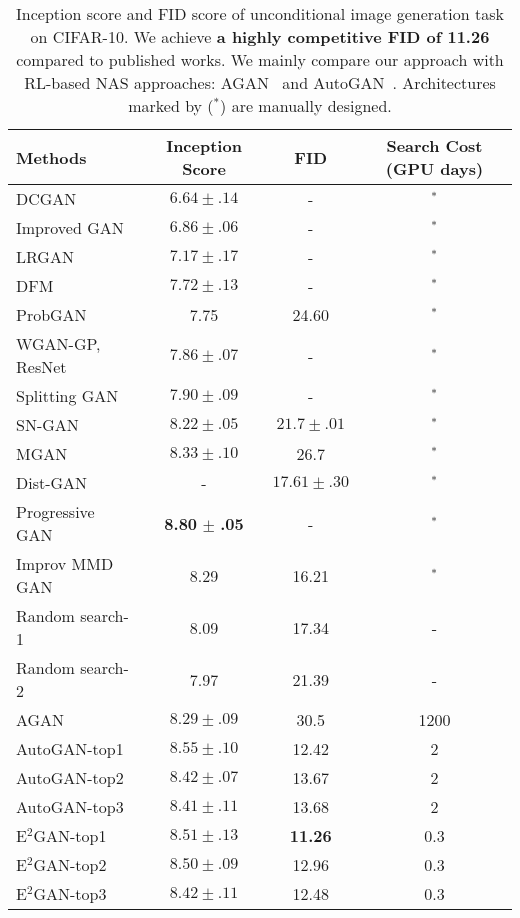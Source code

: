 \documentclass[runningheads]{llncs}
\begin{document}
\begin{table}[b!]
\begin{center}
\begin{tabular}{l|c|c|c}
Methods&Inception Score&FID&Search Cost (GPU days)\\
\hline
DCGAN~\cite{radford2015unsupervised}& $6.64 \pm .14$&-&$^*$\\
Improved GAN~\cite{salimans2016improved}& $6.86 \pm .06$&-&$^*$\\
LRGAN~\cite{yang2017lr}&$7.17 \pm .17$&-&$^*$\\
DFM~\cite{warde2016improving}&$7.72 \pm .13$&-&$^*$\\
ProbGAN~\cite{he2019probgan}& 7.75&24.60 &$^*$ \\
WGAN-GP, ResNet~\cite{gulrajani2017improved}& $7.86 \pm .07 $&-&$^*$ \\
Splitting GAN~\cite{grinblat2017class}&  $7.90 \pm.09 $&-&$^*$\\
SN-GAN~\cite{miyato2018spectral}&  $8.22 \pm .05 $&$21.7 \pm .01$&$^*$\\
MGAN~\cite{hoang2018mgan}&  $8.33 \pm .10 $&26.7&$^*$ \\
Dist-GAN~\cite{tran2018dist}&- &$17.61 \pm .30$&$^*$\\
Progressive GAN~\cite{karras2017progressive}&  \textbf{8.80} $\pm$ \textbf{.05 }&-&$^*$\\
Improv MMD GAN~\cite{wang2018improving} & 8.29&16.21&$^*$\\
\hline 
\hline
Random search-1~\cite{gong2019autogan}& 8.09 &17.34&-\\
Random search-2~\cite{gong2019autogan}& 7.97 &21.39&-\\
\hline
AGAN~\cite{wang2019agan}&$8.29 \pm .09 $&30.5&1200\\
AutoGAN-top1~\cite{gong2019autogan} &  $8.55 \pm .10 $ &12.42&2\\
AutoGAN-top2~\cite{gong2019autogan}& $8.42 \pm .07 $&13.67&2\\
AutoGAN-top3~\cite{gong2019autogan}   &  $8.41 \pm .11 $&13.68&2\\
\hline
E$^2$GAN-top1 & $8.51\pm .13$&\textbf{11.26}&0.3\\
E$^2$GAN-top2 & $8.50\pm .09$&12.96&0.3 \\
E$^2$GAN-top3 & $8.42\pm .11$&12.48&0.3 \\
\end{tabular}
\end{center}
\caption{Inception score and FID score of unconditional image generation task on CIFAR-10. We achieve \textbf{a highly competitive FID of 11.26} compared to published works. We mainly compare our approach with RL-based NAS approaches: AGAN~\cite{wang2019agan} and AutoGAN~\cite{gong2019autogan}. Architectures marked by ($^*$) are manually designed.}
\label{rcifar}
\end{table}
\end{document}

